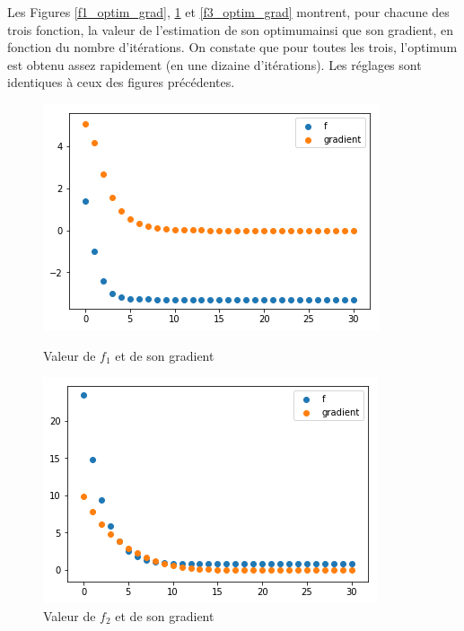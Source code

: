\documentclass[a4paper]{article}
\begin{document}
Les Figures \ref{f1_optim_grad}, \ref{f2_optim_grad} et \ref{f3_optim_grad} montrent, pour chacune des trois fonction, la valeur de l'estimation de son optimumainsi que son gradient, en fonction du nombre d'itérations. On constate que pour toutes les trois, l'optimum est obtenu assez rapidement (en une dizaine d'itérations). Les réglages sont identiques à ceux des figures précédentes.

\begin{figure}[ht!]
\begin{center}
\begin{minipage}{0.45\textwidth}
\includegraphics[scale=0.5]{f1_optim_grad.png}
\caption{Valeur de $f_1$ et de son gradient}
\label{f1_optim_grad}
\end{minipage}\hfill
\begin{minipage}{0.45\textwidth}
\includegraphics[scale=0.5]{f2_optim_grad.png}
\caption{Valeur de $f_2$ et de son gradient}
\label{f2_optim_grad}
\end{minipage}
\end{center}
\end{figure}
\end{document}

